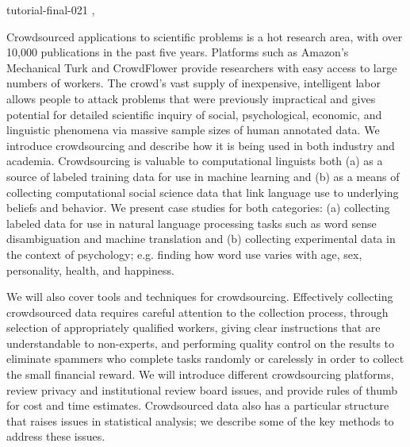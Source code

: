 \begin{tutorial}
  {tutorial-final-021}
  {\daydateyear, \tutorialmorningtime}
  {\TutLocB}

Crowdsourced applications to scientific problems is a hot research area, with over 10,000 publications in the past five years. Platforms such as Amazon’s Mechanical Turk and CrowdFlower provide researchers with easy access to large numbers of workers. The crowd’s vast supply of inexpensive, intelligent labor allows people to attack problems that were previously impractical and gives potential for detailed scientific inquiry of social, psychological, economic, and linguistic phenomena via massive sample sizes of human annotated data. We introduce crowdsourcing and describe how it is being used in both industry and academia. Crowdsourcing is valuable to computational linguists both (a) as a source of labeled training data for use in machine learning and (b) as a means of collecting computational social science data that link language use to underlying beliefs and behavior. We present case studies for both categories: (a) collecting labeled data for use in natural language processing tasks such as word sense disambiguation and machine translation and (b) collecting experimental data in the context of psychology; e.g. finding how word use varies with age, sex, personality, health, and happiness.

We will also cover tools and techniques for crowdsourcing. Effectively collecting crowdsourced data requires careful attention to the collection process, through selection of appropriately qualified workers, giving clear instructions that are understandable to non-experts, and performing quality control on the results to eliminate spammers who complete tasks randomly or carelessly in order to collect the small financial reward. We will introduce different crowdsourcing platforms, review privacy and institutional review board issues, and provide rules of thumb for cost and time estimates. Crowdsourced data also has a particular structure that raises issues in statistical analysis; we describe some of the key methods to address these issues.

\end{tutorial}

